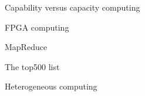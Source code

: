  {Capability versus capacity computing}
\label{sec:capacity}


\begin{notready}
 {FPGA computing}

\end{notready}

 {MapReduce}
\label{sec:mapreduce}


 {The top500 list}
\label{sec:top500}


 {Heterogeneous computing}
\label{sec:heterogeneous}

